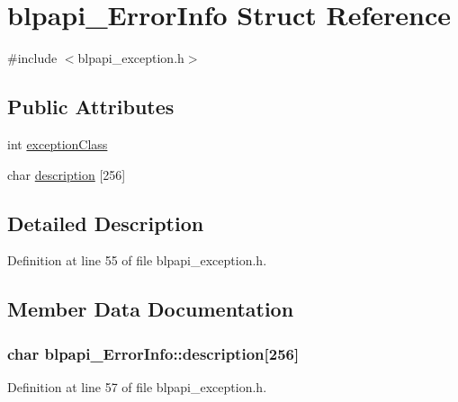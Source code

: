 \hypertarget{structblpapi___error_info}{}\section{blpapi\+\_\+\+Error\+Info Struct Reference}
\label{structblpapi___error_info}


{\ttfamily \#include $<$blpapi\+\_\+exception.\+h$>$}

\subsection*{Public Attributes}
\begin{DoxyCompactItemize}
\item 
int \hyperlink{structblpapi___error_info_ab44f4d27997b5e2060b1d602bd0fb361}{exception\+Class}
\item 
char \hyperlink{structblpapi___error_info_a9cf1fd7fc1ddb661039a94625080dc5f}{description} \mbox{[}256\mbox{]}
\end{DoxyCompactItemize}


\subsection{Detailed Description}


Definition at line 55 of file blpapi\+\_\+exception.\+h.



\subsection{Member Data Documentation}
\subsubsection[{\texorpdfstring{description}{description}}]{\setlength{\rightskip}{0pt plus 5cm}char blpapi\+\_\+\+Error\+Info\+::description\mbox{[}256\mbox{]}}\hypertarget{structblpapi___error_info_a9cf1fd7fc1ddb661039a94625080dc5f}{}\label{structblpapi___error_info_a9cf1fd7fc1ddb661039a94625080dc5f}


Definition at line 57 of file blpapi\+\_\+exception.\+h.

